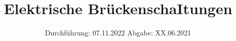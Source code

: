 

\subject{Versuch Nr.V44}
\title{Elektrische BrückenschaItungen}
\date{%
  Durchführung: 07.11.2022
  \hspace{3em}
  Abgabe: XX.06.2021
}



\maketitle
\thispagestyle{empty}
\tableofcontents
\newpage 



%
%
%
%

\nocite{*}

\printbibliography{}


